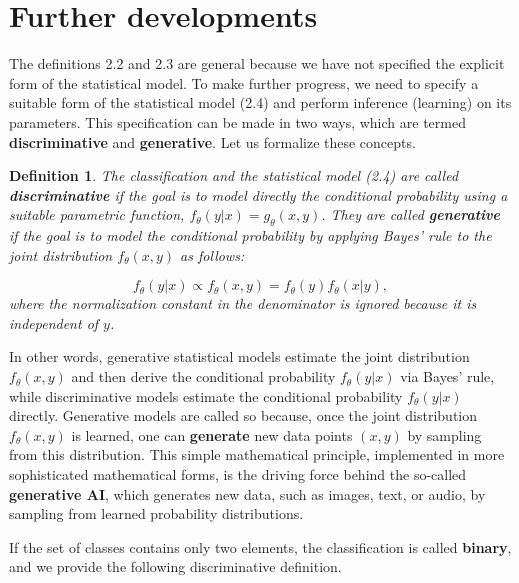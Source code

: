 \documentclass{report}
\newtheorem{definition}{Definition}[chapter]
\begin{document}
\section{Further developments}
The definitions 2.2 and 2.3 are general because we have not specified the explicit form of the statistical model. To make further progress, we need to specify a suitable form of the statistical model (2.4) and perform inference (learning) on its parameters. This specification can be made in two ways, which are termed \textbf{discriminative} and \textbf{generative}. Let us formalize these concepts.

\begin{definition}
The classification and the statistical model (2.4) are called \textbf{discriminative} if the goal is to model directly the conditional probability using a suitable parametric function, $f_\theta(y|x) = g_\theta(x, y)$. They are called \textbf{generative} if the goal is to model the conditional probability by applying Bayes' rule to the joint distribution $f_\theta(x,y)$ as follows:

\begin{equation}
f_\theta(y|x) \propto f_\theta(x,y) = f_\theta(y)f_\theta(x|y),
\end{equation}
where the normalization constant in the denominator is ignored because it is independent of $y$.
\end{definition}
In other words, generative statistical models estimate the joint distribution $f_\theta(x,y)$ and then derive the conditional probability $f_\theta(y|x)$ via Bayes' rule, while discriminative models estimate the conditional probability $f_\theta(y|x)$ directly. Generative models are called so because, once the joint distribution $f_\theta(x,y)$ is learned, one can \textbf{generate} new data points $(x,y)$ by sampling from this distribution. This simple mathematical principle, implemented in more sophisticated mathematical forms, is the driving force behind the so-called \textbf{generative AI}, which generates new data, such as images, text, or audio, by sampling from learned probability distributions.

If the set of classes contains only two elements, the classification is called \textbf{binary}, and we provide the following discriminative definition.
\end{document}
